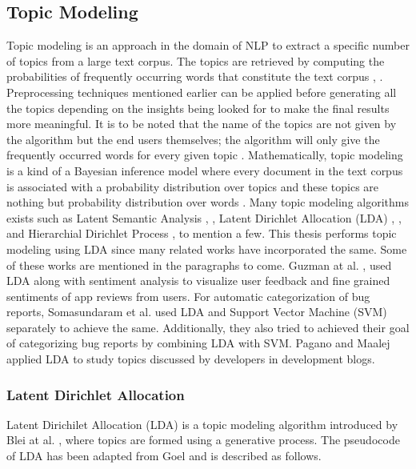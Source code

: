 \documentclass[a4paper,12pt,twoside]{report}
\begin{document}
\subsection{Topic Modeling}
Topic modeling is an approach in the domain of \acs{NLP} to extract a specific number of topics from a large text corpus. The topics are retrieved by computing the probabilities of frequently occurring words that constitute the text corpus \cite{Zou2017}, \cite{Linstead2007}. Preprocessing techniques mentioned earlier can be applied before generating all the topics depending on the insights being looked for to make the final results more meaningful. It is to be noted that the name of the topics are not given by the algorithm but the end users themselves; the algorithm will only give the frequently occurred words for every given topic \cite{Goel2017}.
\newline \newline
Mathematically, topic modeling is a kind of a Bayesian inference model where every document in the text corpus is associated with a probability distribution over topics and these topics are nothing but probability distribution over words \cite{Goel2017}. Many topic modeling algorithms exists such as Latent Semantic Analysis \cite{Agung2017}, \cite{Tu2017}, Latent Dirichlet Allocation (\acs{LDA}) \cite{Katsumata2016}, \cite{Chen2016}, and Hierarchial Dirichlet Process \cite{Li2018}, \cite{Hu2017} to mention a few. This thesis performs topic modeling using \acs{LDA} since many related works have incorporated the same. Some of these works are mentioned in the paragraphs to come. 
\newline \newline
Guzman at al. \cite{Guzman2015}, \cite{Guzman2014} used \acs{LDA} along with sentiment analysis to visualize user feedback and fine grained sentiments of app reviews from users. For automatic categorization of bug reports, Somasundaram et al. \cite{Somasundaram2012} used \acs{LDA} and Support Vector Machine (\acs{SVM}) separately to achieve the same. Additionally, they also tried to achieved their goal of categorizing bug reports by combining \acs{LDA} with \acs{SVM}. Pagano and Maalej\cite{Pagano2011} applied \acs{LDA} to study topics discussed by developers in development blogs. 

\subsubsection{Latent Dirichlet Allocation}
Latent Dirichilet Allocation (\acs{LDA}) is a topic modeling algorithm introduced by Blei at al. \cite{Blei2003}, where topics are formed using a generative process. The pseudocode of \acs{LDA} has been adapted from Goel \cite{Goel2017} and is described as follows.
\end{document}
